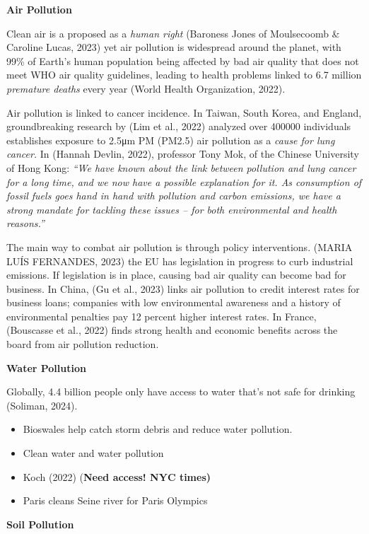 \documentclass[
  letterpaper,
  DIV=11,
  numbers=noendperiod]{scrartcl}
\begin{document}
\textbf{Air Pollution}

Clean air is a proposed as a \emph{human right} (Baroness Jones of
Moulsecoomb \& Caroline Lucas, 2023) yet air pollution is widespread
around the planet, with 99\% of Earth's human population being affected
by bad air quality that does not meet WHO air quality guidelines,
leading to health problems linked to 6.7 million \emph{premature deaths}
every year (World Health Organization, 2022).

Air pollution is linked to cancer incidence. In Taiwan, South Korea, and
England, groundbreaking research by (Lim et al., 2022) analyzed over
400000 individuals establishes exposure to 2.5μm PM (PM2.5) air
pollution as a \emph{cause for lung cancer.} In (Hannah Devlin, 2022),
professor Tony Mok, of the Chinese University of Hong Kong: \emph{``We
have known about the link between pollution and lung cancer for a long
time, and we now have a possible explanation for it. As consumption of
fossil fuels goes hand in hand with pollution and carbon emissions, we
have a strong mandate for tackling these issues -- for both
environmental and health reasons.''}

The main way to combat air pollution is through policy interventions.
(MARIA LUÍS FERNANDES, 2023) the EU has legislation in progress to curb
industrial emissions. If legislation is in place, causing bad air
quality can become bad for business. In China, (Gu et al., 2023) links
air pollution to credit interest rates for business loans; companies
with low environmental awareness and a history of environmental
penalties pay 12 percent higher interest rates. In France, (Bouscasse et
al., 2022) finds strong health and economic benefits across the board
from air pollution reduction.

\textbf{Water Pollution}

Globally, 4.4 billion people only have access to water that's not safe
for drinking (Soliman, 2024).

\begin{itemize}
\item
  Bioswales help catch storm debris and reduce water pollution.
\item
  Clean water and water pollution
\item
  Koch (2022) (\textbf{Need access! NYC times)}
\item
  Paris cleans Seine river for Paris Olympics
\end{itemize}

\textbf{Soil Pollution}
\end{document}
